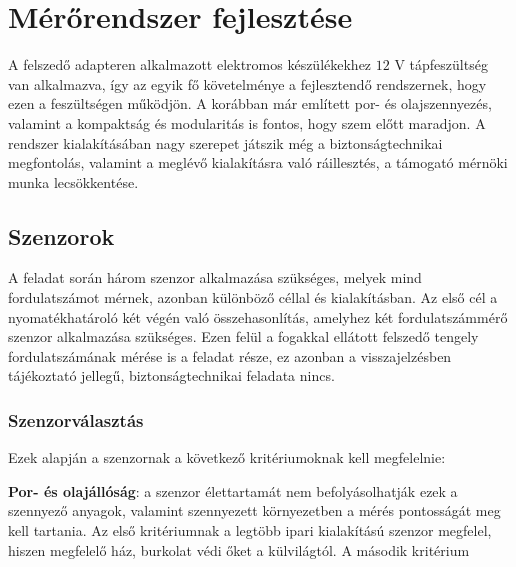 \chapter{Mérőrendszer fejlesztése}
\label{sec:Fejleszt}


A felszedő adapteren alkalmazott elektromos készülékekhez $12$ V tápfeszültség van alkalmazva, így az egyik fő követelménye a fejlesztendő rendszernek, hogy ezen a feszültségen működjön. A korábban már említett por- és olajszennyezés, valamint a kompaktság és modularitás is fontos, hogy szem előtt maradjon. A rendszer kialakításában nagy szerepet játszik még a biztonságtechnikai megfontolás, valamint a meglévő kialakításra való ráillesztés, a támogató mérnöki munka lecsökkentése.

\section{Szenzorok}

A feladat során három szenzor alkalmazása szükséges, melyek mind fordulatszámot mérnek, azonban különböző céllal és kialakításban. Az első cél a nyomatékhatároló két végén való összehasonlítás, amelyhez két fordulatszámmérő szenzor alkalmazása szükséges. Ezen felül a fogakkal ellátott felszedő tengely fordulatszámának mérése is a feladat része, ez azonban a visszajelzésben tájékoztató jellegű, biztonságtechnikai feladata nincs.

\subsection{Szenzorválasztás}

Ezek alapján a szenzornak a következő kritériumoknak kell megfelelnie:

\textbf{Por- és olajállóság}: a szenzor élettartamát nem befolyásolhatják ezek a szennyező anyagok, valamint szennyezett környezetben a mérés pontosságát meg kell tartania. Az első kritériumnak a legtöbb ipari kialakítású szenzor megfelel, hiszen megfelelő ház, burkolat védi őket a külvilágtól. A második kritérium


